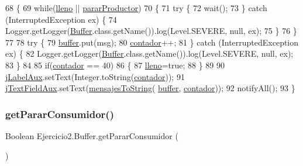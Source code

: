 \begin{DoxyCode}
68     \{
69         \textcolor{keywordflow}{while}(\mbox{\hyperlink{class_ejercicio2_1_1_buffer_a2f6412c605d99ad74a4f325e5d8b0385}{lleno}} || \mbox{\hyperlink{class_ejercicio2_1_1_buffer_a519b556e9529e75803b99114dbdd0eab}{pararProductor}})
70         \{
71             \textcolor{keywordflow}{try} \{
72                 wait();
73             \} \textcolor{keywordflow}{catch} (InterruptedException ex) \{
74                 Logger.getLogger(\mbox{\hyperlink{class_ejercicio2_1_1_buffer_a3d628b4ba6b253cceefa6455fa44f164}{Buffer}}.class.getName()).log(Level.SEVERE, null, ex);
75             \}
76         \}
77         
78         \textcolor{keywordflow}{try} \{
79             \mbox{\hyperlink{class_ejercicio2_1_1_buffer_a63ddce4482528c08b1023ab9ea3842ce}{buffer}}.put(msg);
80             \mbox{\hyperlink{class_ejercicio2_1_1_buffer_a323b888df0fbc24a4fd9da8dd1960639}{contador}}++;
81         \} \textcolor{keywordflow}{catch} (InterruptedException ex) \{
82             Logger.getLogger(\mbox{\hyperlink{class_ejercicio2_1_1_buffer_a3d628b4ba6b253cceefa6455fa44f164}{Buffer}}.class.getName()).log(Level.SEVERE, null, ex);
83         \}
84         
85         \textcolor{keywordflow}{if}(\mbox{\hyperlink{class_ejercicio2_1_1_buffer_a323b888df0fbc24a4fd9da8dd1960639}{contador}} == 40)
86         \{
87             \mbox{\hyperlink{class_ejercicio2_1_1_buffer_a2f6412c605d99ad74a4f325e5d8b0385}{lleno}}=\textcolor{keyword}{true};
88         \}
89         
90         \mbox{\hyperlink{class_ejercicio2_1_1_buffer_a032718b3d95a8db4bc7846846134e4e6}{jLabelAux}}.setText(Integer.toString(\mbox{\hyperlink{class_ejercicio2_1_1_buffer_a323b888df0fbc24a4fd9da8dd1960639}{contador}}));
91         \mbox{\hyperlink{class_ejercicio2_1_1_buffer_a33d8699257b7b05f8023b7a49f7ef7e0}{jTextFieldAux}}.setText(\mbox{\hyperlink{class_ejercicio2_1_1_buffer_a434d7d9dfdec59f5a88a52ea67eeca01}{mensajesToString}}(
      \mbox{\hyperlink{class_ejercicio2_1_1_buffer_a63ddce4482528c08b1023ab9ea3842ce}{buffer}}, \mbox{\hyperlink{class_ejercicio2_1_1_buffer_a323b888df0fbc24a4fd9da8dd1960639}{contador}}));
92         notifyAll();
93     \}
\end{DoxyCode}
\mbox{\label{class_ejercicio2_1_1_buffer_aad0c2fc26ac6bedd2c027867f2026f32}} 
\subsubsection{\texorpdfstring{get\+Parar\+Consumidor()}{getPararConsumidor()}}
{\footnotesize\ttfamily Boolean Ejercicio2.\+Buffer.\+get\+Parar\+Consumidor (\begin{DoxyParamCaption}{ }\end{DoxyParamCaption})\hspace{0.3cm}{\ttfamily [inline]}}


